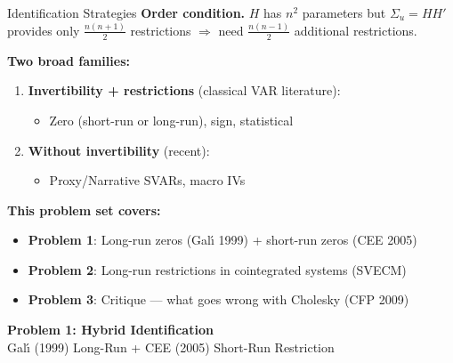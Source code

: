 \documentclass[aspectratio=169,11pt]{beamer}
\begin{document}
\begin{frame}{Identification Strategies}
    \textbf{Order condition.} $H$ has $n^2$ parameters but $\Sigma_u = HH'$ provides only $\tfrac{n(n+1)}{2}$ restrictions $\Rightarrow$ need $\tfrac{n(n-1)}{2}$ additional restrictions.

    \vspace{0.4em}
    \textbf{Two broad families:}
    \begin{enumerate}
        \item \textbf{Invertibility + restrictions} (classical VAR literature):
        \begin{itemize}
            \item Zero (short-run or long-run), sign, statistical
        \end{itemize}
        \item \textbf{Without invertibility} (recent):
        \begin{itemize}
            \item Proxy/Narrative SVARs, macro IVs
        \end{itemize}
    \end{enumerate}

    \vspace{0.4em}
    \textbf{This problem set covers:}
    \begin{itemize}
        \item \textbf{Problem 1}: Long-run zeros (Gal\'{\i} 1999) + short-run zeros (CEE 2005)
        \item \textbf{Problem 2}: Long-run restrictions in cointegrated systems (SVECM)
        \item \textbf{Problem 3}: \textcolor{mitred}{Critique} --- what goes wrong with Cholesky (CFP 2009)
    \end{itemize}
\end{frame}

\begin{frame}[plain]
    \begin{center}
        {\Large \textbf{Problem 1: Hybrid Identification}}\\[1em]
        {\large Gal\'{\i} (1999) Long-Run + CEE (2005) Short-Run Restriction}
    \end{center}
\end{frame}
\end{document}

